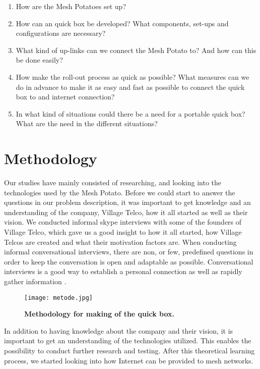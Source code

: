 \begin{enumerate}
\item How are the Mesh Potatoes set up? 
\item How can an \gls{quick} box be developed? What components, set-ups and configurations are necessary?
\item What kind of up-links can we connect the Mesh Potato to? And how can this be done easily? 
\item How make the roll-out process as quick as possible? What measures can we do in advance to make it as easy and fast as possible to connect the \gls{quick} box to and internet connection?
\item In what kind of situations could there be a need for a portable \gls{quick} box? What are the need in the different situations?
\end{enumerate}


\section{Methodology}

Our studies have mainly consisted of researching, and looking into the technologies used by the Mesh Potato. Before we could start to answer the questions in our problem description, it was important to get knowledge and an understanding of the company, Village Telco, how it all started as well as their vision. We conducted informal skype interviews with some of the founders of Village Telco, which gave us a good insight to how it all started, how Village Telcos are created and what their motivation factors are. When conducting informal conversational interviews, there are non, or few, predefined questions in order to keep the conversation is open and adaptable as possible. Conversational interviews is a good way to establish a personal connection as well as rapidly gather information  \cite{interview}. 

\begin{figure}[b]
  \centering
      \texttt{[image: metode.jpg]}
  \caption [Methodology for making of the \gls{quick} box]{\textbf{Methodology for making of the \gls{quick} box.}}
  \label{fig:metode}
\end{figure}


In addition to having knowledge about the company and their vision, it is important to get an understanding of the technologies utilized. This enables the possibility to conduct further research and testing. After this theoretical learning process, we started looking into how Internet can be provided to mesh networks. 

